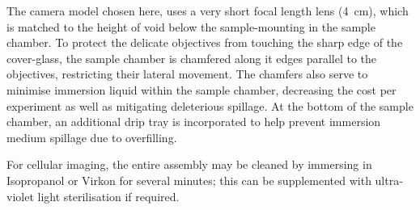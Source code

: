 The camera model chosen here, uses a very short focal length lens (\SI{4}{\centi\metre}), which is matched to the height of void below the sample-mounting in the sample chamber.
To protect the delicate objectives from touching the sharp edge of the cover-glass, the sample chamber is chamfered along it edges parallel to the objectives, restricting their lateral movement.
The chamfers also serve to minimise immersion liquid within the sample chamber, decreasing the cost per experiment as well as mitigating deleterious spillage.
At the bottom of the sample chamber, an additional drip tray is incorporated to help prevent immersion medium spillage due to overfilling.

For cellular imaging, the entire assembly may be cleaned by immersing in Isopropanol or Virkon for several minutes; this can be supplemented with ultra-violet light sterilisation if required.

